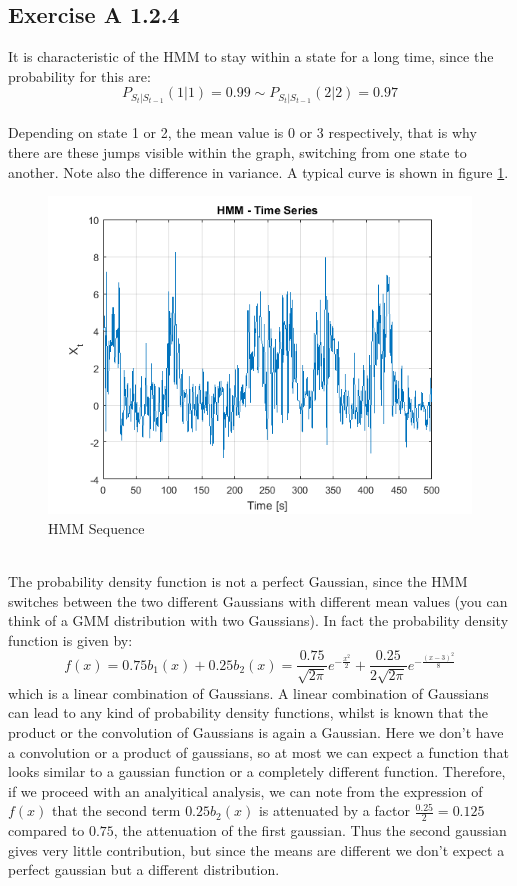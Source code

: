 \documentclass[10pt,a4paper,final]{article}
\begin{document}
\subsection{Exercise A 1.2.4}

It is characteristic of the HMM to stay within a state for a long time, since the probability for this are: $$P_{S_t|S_{t-1}}(1|1)=0.99 \sim P_{S_t|S_{t-1}}(2|2)=0.97$$\\ Depending on state 1 or 2, the mean value is 0 or 3 respectively, that is why there are these jumps visible within the graph, switching from one state to another. Note also the difference in variance.	
A typical curve is shown in figure \ref{fig:A1}.
\begin{figure}[h]
		\centering
		\includegraphics[width=0.55\linewidth]{./images/A1.png}
		\caption{HMM Sequence}
		\label{fig:A1}	
\end{figure}\\
The probability density function is not a perfect Gaussian, since the HMM switches between the two different Gaussians with different mean values (you can think of a GMM distribution with two Gaussians).
In fact the probability density function is given by: $$
f(x) = 0.75b_1(x) + 0.25b_2(x) =  \frac{0.75}{\sqrt{2\pi}}e^{-\frac{x^2}{2}}+  \frac{0.25}{2\sqrt{2\pi}}e^{-\frac{(x-3)^2}{8}}$$
which is  a linear combination of Gaussians. A linear combination of Gaussians can lead to any kind of probability density functions, whilst is known that the product or the convolution of Gaussians is again a Gaussian. Here we don't have a convolution or a product of gaussians, so at most we can expect a function that looks similar to a  gaussian function or a completely different function. Therefore, if we proceed with an analyitical analysis, we can note from the expression of $f(x)$ that the second term $0.25b_2(x)$ is attenuated by a factor $\frac{0.25}{2}=0.125$ compared to $0.75$, the attenuation of the first gaussian.  Thus the second gaussian gives very little contribution, but since the means are different we don't expect a perfect gaussian but a  different distribution.
\end{document}
